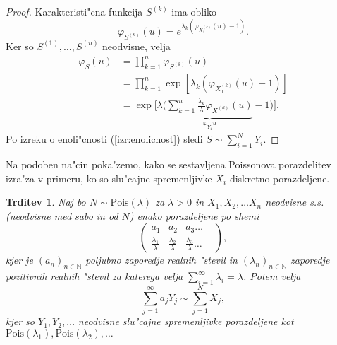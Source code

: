 \documentclass[12pt, a4paper, reqno]{amsart}
\theoremstyle{definition}
\theoremstyle{plain}
\newtheorem{trditev}[definicija]{Trditev}
\newcommand{\N}{\mathbb{N}}
\newcommand{\1}{\mathds{1}}
\newcommand{\Pois}[1]{\text{Pois}(#1)}
\begin{document}
    \begin{proof}
        Karakteristi"cna funkcija $S^{(k)}$ ima obliko
        \begin{equation*}
            \varphi_{S^{(k)}}(u) = e^{\lambda_k\left(\varphi_{X_1^{(k)}}(u) - 1\right)}.
        \end{equation*}
        Ker so $S^{(1)}, \dots, S^{(n)}$ neodvisne, velja
        \begin{align*}
            \varphi_{S}(u) 
                &= \prod_{k=1}^n\varphi_{S^{(k)}}(u) \\
                &= \prod_{k=1}^n\exp\left[\lambda_k\left(\varphi_{X_1^{(k)}}(u) - 1\right)\right] \\
                &= \exp\Biggl[\lambda\Biggl(\underbrace{\sum_{k=1}^n \frac{\lambda_k}{\lambda} \varphi_{X_1^{(k)}}(u)}_{\varphi_{Y_1}{u}} - 1\Biggr)\Biggr].
        \end{align*}
        Po izreku o 
        enoli"cnosti (\ref{izr:enolicnost}) sledi $S\sim\sum_{i=1}^{N}Y_i$.
    \end{proof}

    Na podoben na"cin poka"zemo, kako se sestavljena Poissonova porazdelitev izra"za v primeru, ko so
    slu"cajne spremenljivke $X_i$ diskretno porazdeljene.

    \begin{trditev}
        Naj bo $N\sim \Pois{\lambda}$  za $\lambda >0$ in $X_1, X_2, \dots X_n$ neodvisne s.s. (neodvisne 
        med sabo in od $N$) enako porazdeljene po shemi
        $$ 
        \begin{pmatrix}
            a_1 & a_2 & a_3  \dots & \\
            \tfrac{\lambda_1}{\lambda} & \tfrac{\lambda_2}{\lambda} & \tfrac{\lambda_3}{\lambda} \dots & 
        \end{pmatrix},
        $$
        kjer je $(a_n)_{n\in\N}$ poljubno zaporedje realnih "stevil in 
        $(\lambda_n)_{n\in\N}$ zaporedje pozitivnih realnih "stevil za katerega velja 
        ${\sum_{i=1}^\infty\lambda_i = \lambda}$.
        Potem velja 
        \begin{equation*}
            \sum_{j=1}^\infty a_jY_j \sim \sum_{j=1}^NX_j,
        \end{equation*}
        kjer so $Y_1,Y_2,  \dots$ neodvisne slu"cajne spremenljivke porazdeljene kot \\
        $\Pois{\lambda_1},\Pois{\lambda_2}, \dots$
        \label{trd:NXjeEnakoaY}
    \end{trditev}
\end{document}
